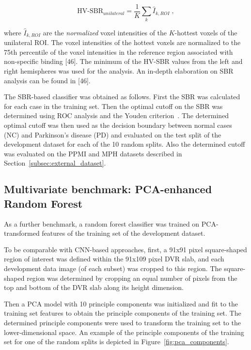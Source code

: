 \begin{equation}\label{eq:sbr}
  \text{HV-SBR}_{unilateral} = \frac{1}{K} \sum_{k} \hat{I}_{k, ROI} \;,
\end{equation}

where $\hat{I}_{k, ROI}$ are the \textit{normalized} voxel intensities of the $K$-hottest voxels of the unilateral ROI.
The voxel intensities of the hottest voxels are normalized to the 75th percentile of the voxel intensities 
in the reference region associated with non-specific binding [46].
The minimum of the HV-SBR values from the left and right hemispheres was used for the analysis.
An in-depth elaboration on SBR analysis can be found in [46].

The SBR-based classifier was obtained as follows.
First the SBR was calculated for each case in the training set.
Then the optimal cutoff on the SBR was determined using ROC analysis and the Youden criterion~\citep{Youden1950}.
The determined optimal cutoff was then used as the decision boundary between normal cases (NC) and Parkinson's disease (PD) 
and evaluated on the test split of the development dataset for each of the 10 random splits.
Also the determined cutoff was evaluated on the PPMI and MPH datasets described in Section~\ref{subsec:external_dataset}.

\subsection{Multivariate benchmark: PCA-enhanced Random Forest}
\label{subsec:pca_rfc}

As a further benchmark, a random forest classifier was trained on PCA-transformed features of the training set 
of the development dataset.

To be comparable with CNN-based approaches, first, a 91x91 pixel square-shaped region of interest 
was defined within the 91x109 pixel DVR slab, and each development data image (of each subset) was cropped to this region.
The square-shaped region was determined by cropping an equal number of pixels from the top and bottom 
of the DVR slab along its height dimension.

Then a PCA model with 10 principle components was initialized and fit to the training set features to obtain 
the principle components of the training set.
The determined principle components were used to transform the training set to the lower-dimensional space.
An example of the principle components of the training set for one of the random splits is depicted in Figure~\ref{fig:pca_components}.

